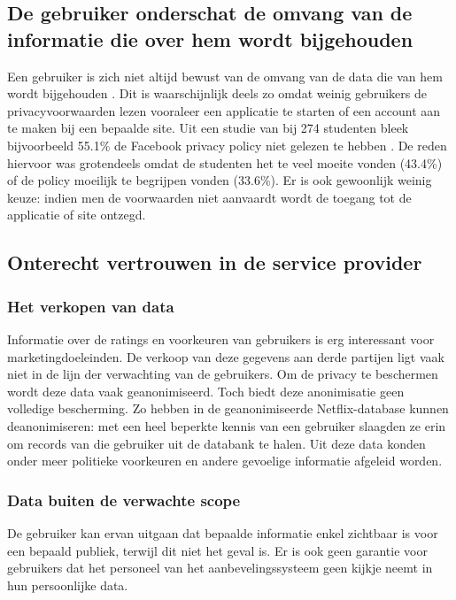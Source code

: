 \subsection{De gebruiker onderschat de omvang van de informatie die over hem wordt bijgehouden}
Een gebruiker is zich niet altijd bewust van de omvang van de data die van hem wordt bijgehouden \cite{pirs}. Dit is waarschijnlijk deels zo omdat weinig gebruikers de privacyvoorwaarden lezen vooraleer een applicatie te starten of een account aan te maken bij een bepaalde site. Uit een studie van \citeauthor{privdisc} bij 274 studenten bleek bijvoorbeeld 55.1\% de Facebook privacy policy niet gelezen te hebben \cite{privdisc}. De reden hiervoor was grotendeels omdat de studenten het te veel moeite vonden (43.4\%) of de policy moeilijk te begrijpen vonden (33.6\%). Er is ook gewoonlijk weinig keuze: indien men de voorwaarden niet aanvaardt wordt de toegang tot de applicatie of site ontzegd.
\subsection{Onterecht vertrouwen in de service provider}
\label{onterecht_vertrouwen}

\subsubsection{Het verkopen van data}
Informatie over de ratings en voorkeuren van gebruikers is erg interessant voor marketingdoeleinden. De verkoop van deze gegevens aan derde partijen ligt vaak niet in de lijn der verwachting van de gebruikers. Om de privacy te beschermen wordt deze data vaak geanonimiseerd. Toch biedt deze anonimisatie geen volledige bescherming. Zo hebben \citeauthor{Narayanan2008} in \cite{Narayanan2008} de geanonimiseerde Netflix-database kunnen deanonimiseren: met een heel beperkte kennis van een gebruiker slaagden ze erin om records van die gebruiker uit de databank te halen. Uit deze data konden onder meer politieke voorkeuren en andere gevoelige informatie afgeleid worden.

\subsubsection{Data buiten de verwachte scope \cite{pirs}}
De gebruiker kan ervan uitgaan dat bepaalde informatie enkel zichtbaar is voor een bepaald publiek, terwijl dit niet het geval is. Er is ook geen garantie voor gebruikers dat het personeel van het aanbevelingssysteem geen kijkje neemt in hun persoonlijke data.\\

